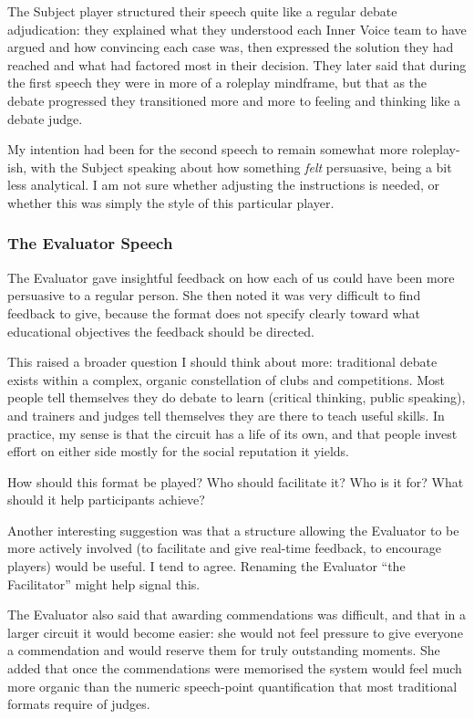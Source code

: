 The Subject player structured their speech quite like a regular debate adjudication: they explained what they understood each Inner Voice team to have argued and how convincing each case was, then expressed the solution they had reached and what had factored most in their decision. They later said that during the first speech they were in more of a roleplay mindframe, but that as the debate progressed they transitioned more and more to feeling and thinking like a debate judge.

My intention had been for the second speech to remain somewhat more roleplay-ish, with the Subject speaking about how something \textit{felt} persuasive, being a bit less analytical. I am not sure whether adjusting the instructions is needed, or whether this was simply the style of this particular player.

\subsubsection{The Evaluator Speech}

The Evaluator gave insightful feedback on how each of us could have been more persuasive to a regular person. She then noted it was very difficult to find feedback to give, because the format does not specify clearly toward what educational objectives the feedback should be directed.

This raised a broader question I should think about more: traditional debate exists within a complex, organic constellation of clubs and competitions. Most people tell themselves they do debate to learn (critical thinking, public speaking), and trainers and judges tell themselves they are there to teach useful skills. In practice, my sense is that the circuit has a life of its own, and that people invest effort on either side mostly for the social reputation it yields.

How should this format be played? Who should facilitate it? Who is it for? What should it help participants achieve?

Another interesting suggestion was that a structure allowing the Evaluator to be more actively involved (to facilitate and give real-time feedback, to encourage players) would be useful. I tend to agree. Renaming the Evaluator ``the Facilitator'' might help signal this.

The Evaluator also said that awarding commendations was difficult, and that in a larger circuit it would become easier: she would not feel pressure to give everyone a commendation and would reserve them for truly outstanding moments. She added that once the commendations were memorised the system would feel much more organic than the numeric speech-point quantification that most traditional formats require of judges.

